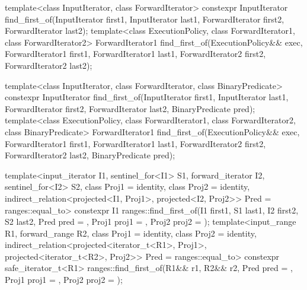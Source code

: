 %
\begin{itemdecl}
template<class InputIterator, class ForwardIterator>
  constexpr InputIterator
    find_first_of(InputIterator first1, InputIterator last1,
                  ForwardIterator first2, ForwardIterator last2);
template<class ExecutionPolicy, class ForwardIterator1, class ForwardIterator2>
  ForwardIterator1
    find_first_of(ExecutionPolicy&& exec,
                  ForwardIterator1 first1, ForwardIterator1 last1,
                  ForwardIterator2 first2, ForwardIterator2 last2);

template<class InputIterator, class ForwardIterator,
         class BinaryPredicate>
  constexpr InputIterator
    find_first_of(InputIterator first1, InputIterator last1,
                  ForwardIterator first2, ForwardIterator last2,
                  BinaryPredicate pred);
template<class ExecutionPolicy, class ForwardIterator1, class ForwardIterator2,
         class BinaryPredicate>
  ForwardIterator1
    find_first_of(ExecutionPolicy&& exec,
                  ForwardIterator1 first1, ForwardIterator1 last1,
                  ForwardIterator2 first2, ForwardIterator2 last2,
                  BinaryPredicate pred);

template<input_iterator I1, sentinel_for<I1> S1, forward_iterator I2, sentinel_for<I2> S2,
         class Proj1 = identity, class Proj2 = identity,
         indirect_relation<projected<I1, Proj1>,
                           projected<I2, Proj2>> Pred = ranges::equal_to>
  constexpr I1 ranges::find_first_of(I1 first1, S1 last1, I2 first2, S2 last2,
                                     Pred pred = {},
                                     Proj1 proj1 = {}, Proj2 proj2 = {});
template<input_range R1, forward_range R2, class Proj1 = identity,
         class Proj2 = identity,
         indirect_relation<projected<iterator_t<R1>, Proj1>,
                           projected<iterator_t<R2>, Proj2>> Pred = ranges::equal_to>
  constexpr safe_iterator_t<R1>
    ranges::find_first_of(R1&& r1, R2&& r2,
                          Pred pred = {},
                          Proj1 proj1 = {}, Proj2 proj2 = {});
\end{itemdecl}

